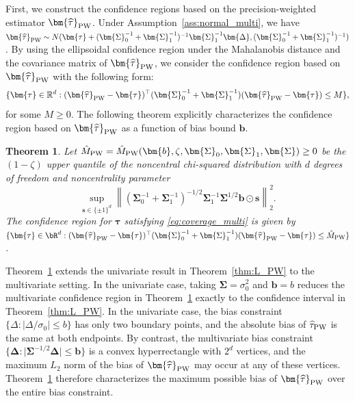 \documentclass[11pt]{article}
\newcommand{\htau}{\widehat\tau}
\numberwithin{equation}{section}
\newtheorem{theorem}{Theorem}[section]
\theoremstyle{definition}
\begin{document}
First, we construct the confidence regions based on the precision-weighted estimator $\bm{\htau}_{\rm PW}$. Under Assumption~\ref{ass:normal_multi}, we have $\bm{\htau}_{\rm PW} \sim N(\bm{\tau} + (\bm{\Sigma}_0^{-1} + \bm{\Sigma}_1^{-1})^{-1} \bm{\Sigma}_1^{-1} \bm{\Delta}, (\bm{\Sigma}_0^{-1} + \bm{\Sigma}_1^{-1})^{-1} )$. By using the ellipsoidal confidence region under the Mahalanobis distance and the covariance matrix of $\bm{\htau}_{\rm PW}$, we consider the confidence region based on $\bm{\htau}_{\rm PW}$ with the following form:
\[
\{\bm{\tau}\in\mathbb{R}^d:(\bm{\htau}_{\rm PW}-\bm{\tau})^\top (\bm{\Sigma}_0^{-1} + \bm{\Sigma}_1^{-1})(\bm{\htau}_{\rm PW}-\bm{\tau})\le M\},
\]
for some $M \ge 0$. The following theorem explicitly characterizes the confidence region based on $\bm{\htau}_{\rm PW}$ as a function of bias bound $\bm{b}$.
\begin{theorem}\label{prop:CI_multi}
  Let $\hat{M}_{\rm PW} = \hat{M}_{\rm PW}(\bm{b}, \zeta, \bm{\Sigma}_0, \bm{\Sigma}_1, \bm{\Sigma}) \ge 0$ be the $(1-\zeta)$ upper quantile of the noncentral chi-squared distribution with $d$ degrees of freedom and noncentrality parameter $$\sup_{\bm{s} \in \{\pm 1\}^d }\left\lVert (\bm{\Sigma}_0^{-1} + \bm{\Sigma}_1^{-1})^{-1/2} \bm{\Sigma}_1^{-1} \bm{\Sigma}^{1/2} \bm{b} \odot \bm{s}\right\rVert_2^2.$$ The confidence region for $\bm{\tau}$ satisfying \eqref{eq:coverage_multi} is given by $\{\bm{\tau} \in \bR^d: (\bm{\htau}_{\rm PW} - \bm{\tau})^\top (\bm{\Sigma}_0^{-1} + \bm{\Sigma}_1^{-1}) (\bm{\htau}_{\rm PW} - \bm{\tau}) \le \hat{M}_{\rm PW}\}$.
\end{theorem}

Theorem~\ref{prop:CI_multi} extends the univariate result in Theorem~\ref{thm:L_PW} to the multivariate setting. In the univariate case, taking $\bm{\Sigma} = \sigma_0^2$ and $\bm{b} = b$ reduces the multivariate confidence region in Theorem~\ref{prop:CI_multi} exactly to the confidence interval in Theorem~\ref{thm:L_PW}. In the univariate case, the bias constraint $\{\Delta: \lvert \Delta/\sigma_0 \rvert \le b\}$ has only two boundary points, and the absolute bias of $\htau_{\rm PW}$ is the same at both endpoints. By contrast, the multivariate bias constraint $\{\bm{\Delta}: \lvert \bm{\Sigma}^{-1/2} \bm{\Delta}\rvert \le \bm{b}\}$ is a convex hyperrectangle with $2^d$ vertices, and the maximum $L_2$ norm of the bias of $\bm{\htau}_{\rm PW}$ may occur at any of these vertices. Theorem~\ref{prop:CI_multi} therefore characterizes the maximum possible bias of $\bm{\htau}_{\rm PW}$ over the entire bias constraint.
\end{document}
